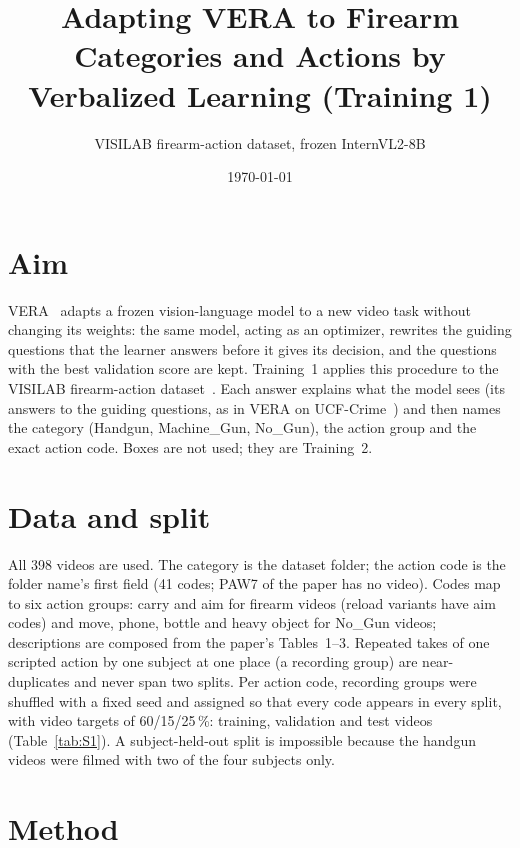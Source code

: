 \documentclass[11pt]{article}
\title{Adapting VERA to Firearm Categories and Actions by Verbalized Learning (Training 1)}
\author{VISILAB firearm-action dataset, frozen InternVL2-8B}
\date{\today}
\begin{document}
\maketitle

\begin{abstract}

\end{abstract}

\section{Aim}
VERA~\cite{ye2025vera} adapts a frozen vision-language model to a new video task without changing its weights: the same model, acting as an optimizer, rewrites the guiding questions that the learner answers before it gives its decision, and the questions with the best validation score are kept. Training~1 applies this procedure to the VISILAB firearm-action dataset~\cite{ruizsantaquiteria2024firearm}. Each answer explains what the model sees (its answers to the guiding questions, as in VERA on UCF-Crime~\cite{sultani2018ucfcrime}) and then names the category (Handgun, Machine\_Gun, No\_Gun), the action group and the exact action code. Boxes are not used; they are Training~2.

\section{Data and split}
All 398 videos are used. The category is the dataset folder; the action code is the folder name's first field (41 codes; PAW7 of the paper has no video). Codes map to six action groups: carry and aim for firearm videos (reload variants have aim codes) and move, phone, bottle and heavy object for No\_Gun videos; descriptions are composed from the paper's Tables~1--3. Repeated takes of one scripted action by one subject at one place (a recording group) are near-duplicates and never span two splits. Per action code, recording groups were shuffled with a fixed seed and assigned so that every code appears in every split, with video targets of 60/15/25\,\%:  training,  validation and  test videos (Table~\ref{tab:S1}). A subject-held-out split is impossible because the handgun videos were filmed with two of the four subjects only.



\section{Method}
\end{document}
